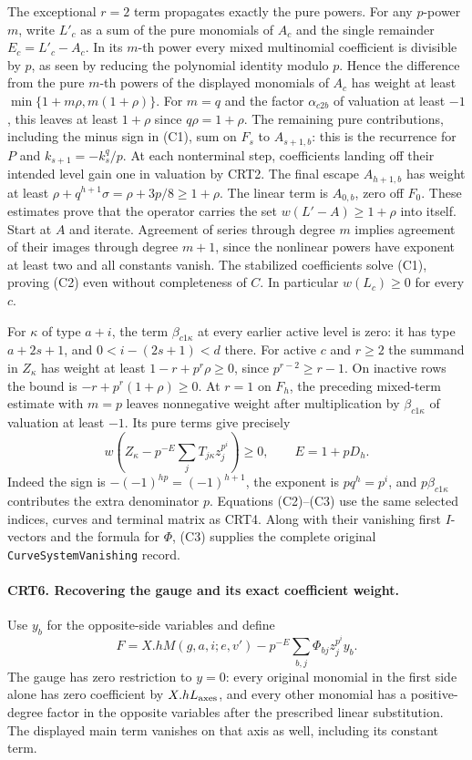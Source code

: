 The exceptional $r=2$ term propagates exactly the pure powers.
For any $p$-power $m$, write $L'_c$ as a sum of the pure monomials
of $A_c$ and the single remainder $E_c=L'_c-A_c$. In its $m$-th
power every mixed multinomial coefficient is divisible by $p$,
as seen by reducing the polynomial identity modulo $p$. Hence the
difference from the pure $m$-th powers of the displayed monomials
of $A_c$ has weight at least
$\min\{1+m\rho,m(1+\rho)\}$. For $m=q$ and the factor
$\alpha_{c2b}$ of valuation at least $-1$, this leaves at least
$1+\rho$ since $q\rho=1+\rho$. The remaining pure contributions,
including the minus sign in (C1), sum on $F_s$ to $A_{s+1,b}$:
this is the recurrence for $P$ and $k_{s+1}=-k_s^q/p$.
At each nonterminal step, coefficients landing off their intended
level gain one in valuation by CRT2. The final escape $A_{h+1,b}$
has weight at least $\rho+q^{h+1}\sigma=\rho+3p/8\ge1+\rho$.
The linear term is $A_{0,b}$, zero off $F_0$. These estimates prove
that the operator carries the set $w(L'-A)\ge1+\rho$ into itself.
Start at $A$ and iterate. Agreement of series through degree $m$
implies agreement of their images through degree $m+1$, since the
nonlinear powers have exponent at least two and all constants vanish.
The stabilized coefficients solve (C1), proving (C2) even without
completeness of $C$. In particular $w(L_c)\ge0$ for every $c$.

For $\kappa$ of type $a+i$, the term $\beta_{c1\kappa}$ at every
earlier active level is zero: it has type $a+2s+1$, and
$0< i-(2s+1)<d$ there. For active $c$ and $r\ge2$ the summand
in $Z_\kappa$ has weight at least $1-r+p^r\rho\ge0$, since
$p^{r-2}\ge r-1$. On inactive rows the bound is
$-r+p^r(1+\rho)\ge0$. At $r=1$ on $F_h$, the preceding mixed-term
estimate with $m=p$ leaves nonnegative weight after multiplication
by $\beta_{c1\kappa}$ of valuation at least $-1$. Its pure terms
give precisely
\[
 w\!\left(Z_\kappa-p^{-E}\sum_j T_{j\kappa}z_j^{p^i}\right)\ge0,
 \qquad E=1+pD_h .                                            \tag{C3}
\]
Indeed the sign is $-(-1)^{hp}=(-1)^{h+1}$, the exponent is
$pq^h=p^i$, and $p\beta_{c1\kappa}$ contributes the extra
denominator $p$. Equations (C2)--(C3) use the same selected indices,
curves and terminal matrix as CRT4. Along with their vanishing first
$I$-vectors and the formula for $\Phi$, (C3) supplies the complete
original \texttt{CurveSystemVanishing} record.

\paragraph{CRT6. Recovering the gauge and its exact coefficient weight.}
Use $y_b$ for the opposite-side variables and define
\[
 F=X.hM(g,a,i;e,v')-p^{-E}\sum_{b,j}\Phi_{bj}z_j^{p^i}y_b .
\]
The gauge has zero restriction to $y=0$: every original monomial
in the first side alone has zero coefficient by $X.hL_{\rm axes}$,
and every other monomial has a positive-degree factor in the opposite
variables after the prescribed linear substitution. The displayed
main term vanishes on that axis as well, including its constant term.

